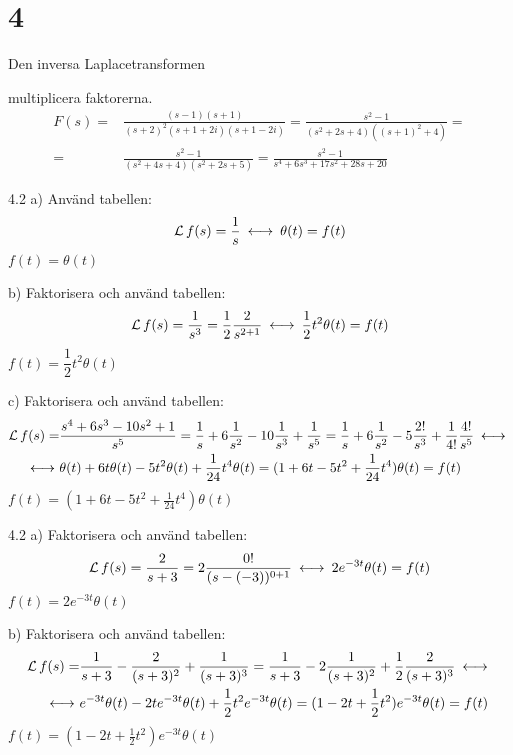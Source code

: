 \chapter{4}{Den inversa Laplacetransformen}

\begin{task}{4.1}
	multiplicera faktorerna.
	\begin{align*}
	F(s)=
	&\frac{(s-1)(s+1)}{(s+2)^2(s+1+2i)(s+1-2i)}=
	\frac{s^2-1}{(s^2+2s+4)((s+1)^2+4)}= \\ =
	&\frac{s^2-1}{(s^2+4s+4)(s^2+2s+5)}=
	\frac{s^2-1}{s^4+6s^3+17s^2+28s+20}
	\end{align*}
\end{task}

\begin{task}{4.2 a)}
	Använd tabellen:
	\[\laplace f(s)=\frac{1}{s}\llra \theta(t)=f(t)\]
	\ans $f(t)=\theta(t)$
\end{task}

\begin{task}{b)}
	Faktorisera och använd tabellen:
	\[\laplace f(s)=\frac{1}{s^3}=\frac{1}{2}\*\frac{2}{s^{2+1}}\llra \frac{1}{2}t^2\theta(t)=f(t)\]
	\ans $f(t)=\dfrac{1}{2}t^2\theta(t)$
\end{task}

\begin{task}{c)}
	Faktorisera och använd tabellen:
	\begin{align*}
	\laplace f(s)=
	&\frac{s^4+6s^3-10s^2+1}{s^5}=
	\frac{1}{s}+6\frac{1}{s^2}-10\frac{1}{s^3}+\frac{1}{s^5}=
	\frac{1}{s}+6\frac{1}{s^2}-5\frac{2!}{s^3}+\frac{1}{4!}\*\frac{4!}{s^5}\llra \\ \llra
	&\theta(t)+6t\theta(t)-5t^2\theta(t)+\frac{1}{24}t^4\theta(t)=
	(1+6t-5t^2+\frac{1}{24}t^4)\theta(t)=
	f(t)
	\end{align*}
	\ans $f(t)=(1+6t-5t^2+\frac{1}{24}t^4)\theta(t)$
\end{task}

\begin{task}{4.2 a)}
	Faktorisera och använd tabellen:
	\[\laplace f(s)=\frac{2}{s+3}=2\frac{0!}{(s-(-3))^{0+1}}\llra 2e^{-3t}\theta(t)=f(t)\]
	\ans $f(t)=2e^{-3t}\theta(t)$
\end{task}

\begin{task}{b)}
	Faktorisera och använd tabellen:
	\begin{align*}
	\laplace f(s)=
	&\frac{1}{s+3}-\frac{2}{(s+3)^2}+\frac{1}{(s+3)^3}=
	\frac{1}{s+3}-2\frac{1}{(s+3)^2}+\frac{1}{2}\*\frac{2}{(s+3)^3}\llra \\ \llra
	&e^{-3t}\theta(t)-2te^{-3t}\theta(t)+\frac{1}{2}t^2e^{-3t}\theta(t)=
	(1-2t+\frac{1}{2}t^2)e^{-3t}\theta(t)=
	f(t)
	\end{align*}
	\ans $f(t)=(1-2t+\frac{1}{2}t^2)e^{-3t}\theta(t)$
\end{task}

